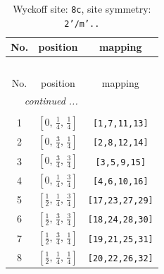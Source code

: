 \documentclass[fleqn,8pt]{jsarticle}
\begin{document}
\renewcommand{\arraystretch}{1.2}
\begin{longtable}{ccc}
\caption{Wyckoff site: {\tt 8c}, site symmetry: {\tt 2'/m'..}}
 \\
 \hline \hline
No. & position & mapping \\ \hline \endfirsthead

\multicolumn{2}{l}{\tablename\ \thetable{}} \\
 \hline \hline
No. & position & mapping \\ \hline \endhead

 \hline \hline
\multicolumn{2}{r}{\footnotesize\it continued ...} \\ \endfoot

 \hline \hline
\multicolumn{2}{r}{} \\ \endlastfoot

1 & $\left[ 0,\, \frac{1}{4},\, \frac{1}{4} \right]$ & {\tt [1,7,11,13]} \\ \hline
2 & $\left[ 0,\, \frac{3}{4},\, \frac{1}{4} \right]$ & {\tt [2,8,12,14]} \\ \hline
3 & $\left[ 0,\, \frac{3}{4},\, \frac{3}{4} \right]$ & {\tt [3,5,9,15]} \\ \hline
4 & $\left[ 0,\, \frac{1}{4},\, \frac{3}{4} \right]$ & {\tt [4,6,10,16]} \\ \hline
5 & $\left[ \frac{1}{2},\, \frac{1}{4},\, \frac{3}{4} \right]$ & {\tt [17,23,27,29]} \\ \hline
6 & $\left[ \frac{1}{2},\, \frac{3}{4},\, \frac{3}{4} \right]$ & {\tt [18,24,28,30]} \\ \hline
7 & $\left[ \frac{1}{2},\, \frac{3}{4},\, \frac{1}{4} \right]$ & {\tt [19,21,25,31]} \\ \hline
8 & $\left[ \frac{1}{2},\, \frac{1}{4},\, \frac{1}{4} \right]$ & {\tt [20,22,26,32]} \\
\end{longtable}
\renewcommand{\arraystretch}{1.2}
\end{document}
